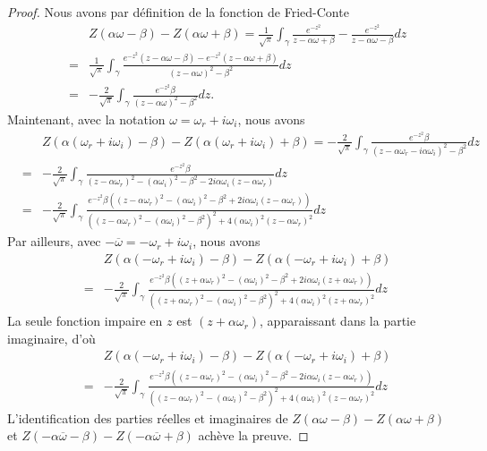 \begin{proof}
Nous avons par définition de la fonction de Fried-Conte
\begin{eqnarray*}
&&Z(\alpha\omega-\beta)-Z(\alpha\omega+\beta)=\frac{1}{\sqrt{\pi}}\int_\gamma\frac{e^{-z^2}}{z-\alpha\omega+\beta}-\frac{e^{-z^2}}{z-\alpha\omega-\beta}dz\\
&=&\frac{1}{\sqrt{\pi}}\int_\gamma\frac{e^{-z^2}(z-\alpha\omega-\beta)-e^{-z^2}(z-\alpha\omega+\beta)}{(z-\alpha\omega)^2-\beta^2}dz\\
&=&-\frac{2}{\sqrt{\pi}}\int_\gamma\frac{e^{-z^2}\beta}{(z-\alpha\omega)^2-\beta^2}dz.
\end{eqnarray*}
%
Maintenant, avec la notation $\omega=\omega_r+i\omega_i$, nous avons
%
\begin{eqnarray*}
&&Z(\alpha(\omega_r+i\omega_i)-\beta)-Z(\alpha(\omega_r+i\omega_i)+\beta)=-\frac{2}{\sqrt{\pi}}\int_\gamma\frac{e^{-z^2}\beta}{(z-\alpha\omega_r-i\alpha\omega_i)^2-\beta^2}dz\\
&=&-\frac{2}{\sqrt{\pi}}\int_\gamma\frac{e^{-z^2}\beta}{(z-\alpha\omega_r)^2-(\alpha\omega_i)^2-\beta^2-2i\alpha\omega_i(z-\alpha\omega_r)}dz\\
&=&-\frac{2}{\sqrt{\pi}}\int_\gamma\frac{e^{-z^2}\beta\left((z-\alpha\omega_r)^2-(\alpha\omega_i)^2-\beta^2+2i\alpha\omega_i(z-\alpha\omega_r)\right)}{\left((z-\alpha\omega_r)^2-(\alpha\omega_i)^2-\beta^2\right)^2+4\left(\alpha\omega_i\right)^2(z-\alpha\omega_r)^2}dz
\end{eqnarray*}
%
Par ailleurs, avec $-\overline{\omega}=-\omega_r+i\omega_i$, nous avons
%
\begin{eqnarray*}
&&Z(\alpha(-\omega_r+i\omega_i)-\beta)-Z(\alpha(-\omega_r+i\omega_i)+\beta)\\
&=&-\frac{2}{\sqrt{\pi}}\int_\gamma\frac{e^{-z^2}\beta\left((z+\alpha\omega_r)^2-(\alpha\omega_i)^2-\beta^2+2i\alpha\omega_i(z+\alpha\omega_r)\right)}{\left((z+\alpha\omega_r)^2-(\alpha\omega_i)^2-\beta^2\right)^2+4\left(\alpha\omega_i\right)^2(z+\alpha\omega_r)^2}dz
\end{eqnarray*}
La seule fonction impaire en $z$ est $(z+\alpha\omega_r)$, apparaissant dans la partie imaginaire, d'où
\begin{eqnarray*}
&&Z(\alpha(-\omega_r+i\omega_i)-\beta)-Z(\alpha(-\omega_r+i\omega_i)+\beta)\\
&=&-\frac{2}{\sqrt{\pi}}\int_\gamma\frac{e^{-z^2}\beta\left((z-\alpha\omega_r)^2-(\alpha\omega_i)^2-\beta^2-2i\alpha\omega_i(z-\alpha\omega_r)\right)}{\left((z-\alpha\omega_r)^2-(\alpha\omega_i)^2-\beta^2\right)^2+4\left(\alpha\omega_i\right)^2(z-\alpha\omega_r)^2}dz
\end{eqnarray*}
L'identification des parties réelles et imaginaires de $Z(\alpha\omega-\beta)-Z(\alpha\omega+\beta)$ et $Z(-\alpha\overline{\omega}-\beta)-Z(-\alpha\overline{\omega}+\beta)$ achève la preuve.
\end{proof}

